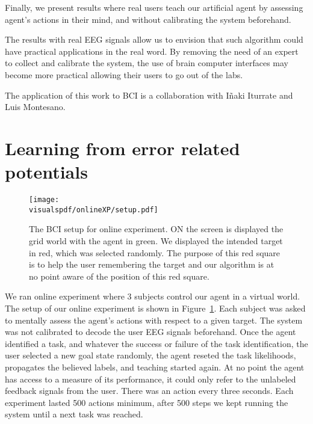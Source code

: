 Finally, we present results where real users teach our artificial agent by assessing agent's actions in their mind, and without calibrating the system beforehand.

The results with real EEG signals allow us to envision that such algorithm could have practical applications in the real word. By removing the need of an expert to collect and calibrate the system, the use of brain computer interfaces may become more practical allowing their users to go out of the labs.

The application of this work to BCI is a collaboration with I{\~n}aki Iturrate and Luis Montesano.

\section{Learning from error related potentials}
\label{chapter:bci:setupandeeg}


\begin{figure}[!htbp]
\centering
\texttt{[image: \\visualspdf/onlineXP/setup.pdf]}
\caption{The BCI setup for online experiment. ON the screen is displayed the grid world with the agent in green. We displayed the intended target in red, which was selected randomly. The purpose of this red square is to help the user remembering the target and our algorithm is at no point aware of the position of this red square.}
\label{fig:BCIsetup}
\end{figure}

We ran online experiment where 3 subjects  control our agent in a virtual world. The setup of our online experiment is shown in Figure~\ref{fig:BCIsetup}. Each subject was asked to mentally assess the agent's actions with respect to a given target. The system was not calibrated to decode the user EEG signals beforehand. Once the agent identified a task, and whatever the success or failure of the task identification, the user selected a new goal state randomly, the agent reseted the task likelihoods, propagates the believed labels, and teaching started again. At no point the agent has access to a measure of its performance, it could only refer to the unlabeled feedback signals from the user. There was an action every three seconds. Each experiment lasted 500 actions minimum, after 500 steps we kept running the system until a next task was reached.

